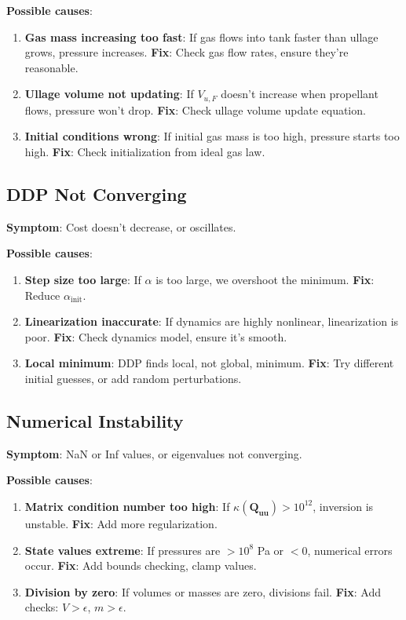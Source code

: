 \documentclass[11pt,a4paper]{article}
\begin{document}
\textbf{Possible causes}:
\begin{enumerate}
    \item \textbf{Gas mass increasing too fast}: If gas flows into tank faster than ullage grows, pressure increases. \textbf{Fix}: Check gas flow rates, ensure they're reasonable.
    \item \textbf{Ullage volume not updating}: If $V_{u,F}$ doesn't increase when propellant flows, pressure won't drop. \textbf{Fix}: Check ullage volume update equation.
    \item \textbf{Initial conditions wrong}: If initial gas mass is too high, pressure starts too high. \textbf{Fix}: Check initialization from ideal gas law.
\end{enumerate}

\subsection{DDP Not Converging}

\textbf{Symptom}: Cost doesn't decrease, or oscillates.

\textbf{Possible causes}:
\begin{enumerate}
    \item \textbf{Step size too large}: If $\alpha$ is too large, we overshoot the minimum. \textbf{Fix}: Reduce $\alpha_{\text{init}}$.
    \item \textbf{Linearization inaccurate}: If dynamics are highly nonlinear, linearization is poor. \textbf{Fix}: Check dynamics model, ensure it's smooth.
    \item \textbf{Local minimum}: DDP finds local, not global, minimum. \textbf{Fix}: Try different initial guesses, or add random perturbations.
\end{enumerate}

\subsection{Numerical Instability}

\textbf{Symptom}: NaN or Inf values, or eigenvalues not converging.

\textbf{Possible causes}:
\begin{enumerate}
    \item \textbf{Matrix condition number too high}: If $\kappa(\mathbf{Q}_{\mathbf{uu}}) > 10^{12}$, inversion is unstable. \textbf{Fix}: Add more regularization.
    \item \textbf{State values extreme}: If pressures are $> 10^8$ Pa or $< 0$, numerical errors occur. \textbf{Fix}: Add bounds checking, clamp values.
    \item \textbf{Division by zero}: If volumes or masses are zero, divisions fail. \textbf{Fix}: Add checks: $V > \epsilon$, $m > \epsilon$.
\end{enumerate}
\end{document}
